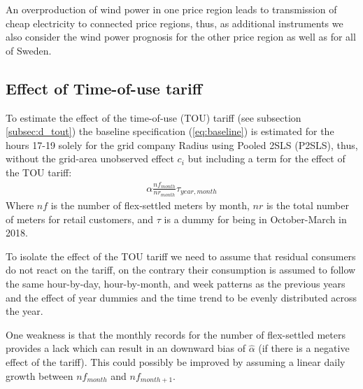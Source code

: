 \noindent
An overproduction of wind power in one price region leads to transmission of cheap electricity to connected price regions, thus, as additional instruments we also consider the wind power prognosis for the other price region as well as for all of Sweden.

\subsection{Effect of Time-of-use tariff}
\label{subsec:e_tout}
To estimate the effect of the time-of-use (TOU) tariff (see subsection \ref{subsec:d_tout}) the baseline specification (\ref{eq:baseline}) is estimated for the hours 17-19 solely for the grid company Radius using Pooled 2SLS (P2SLS), thus, without the grid-area unobserved effect $c_i$ but including a term for the effect of the TOU tariff:
\begin{align}
  \alpha\frac{nf_{month}}{nr_{month}}\tau_{year,month}
  \label{eq:tout}
\end{align}
Where $nf$ is the number of flex-settled meters by month, $nr$ is the total number of meters for retail customers, and $\tau$ is a dummy for being in October-March in 2018.
\par
To isolate the effect of the TOU tariff we need to assume that residual consumers do not react on the tariff, on the contrary their consumption is assumed to follow the same hour-by-day, hour-by-month, and week patterns as the previous years and the effect of year dummies and the time trend to be evenly distributed across the year.
\par
One weakness is that the monthly records for the number of flex-settled meters provides a lack which can result in an downward bias of $\widehat{\alpha}$ (if there is a negative effect of the tariff). This could possibly be improved by assuming a linear daily growth between $nf_{month}$ and $nf_{month+1}$.



